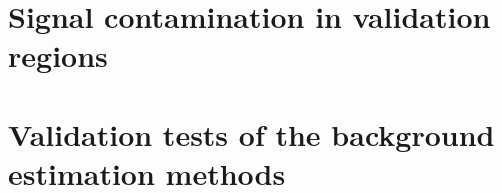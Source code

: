 \section{Signal contamination in validation regions}
\label{app:SignalContamination}

\renewcommand{\arraystretch}{1.5}
\begin{table}[!h]
\centering
\caption{Signal contamination in leptonic control region: $\ecalo>10\gev$ and $\nhits>6$}
\end{table}

\section{Validation tests of the background estimation methods}
\label{app:Validation}


